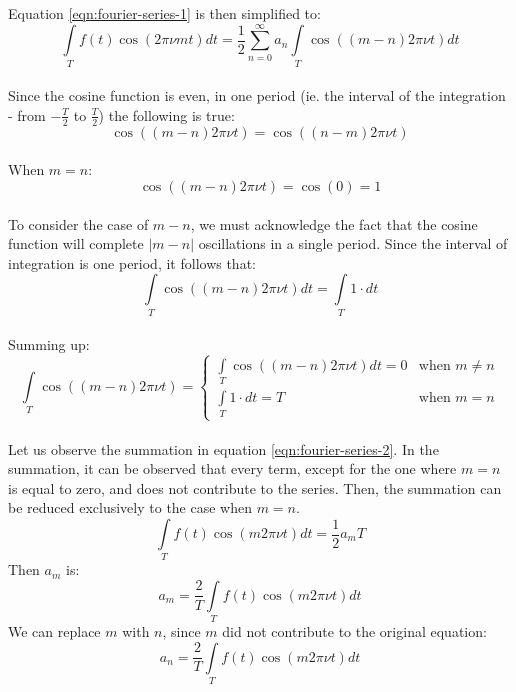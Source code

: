 \documentclass{article}
\begin{document}
Equation \ref{eqn:fourier-series-1} is then simplified to:
\begin{equation}
	\int\limits_{T} f(t) \cos(2 \pi \nu m t) dt = \frac{1}{2} \sum^{\infty}_{n=0} a_n
	\int\limits_{T} \cos( (m - n) 2 \pi \nu t) dt
	\label{eqn:fourier-series-2}
\end{equation}

\paragraph*{}
Since the cosine function is even, in one period (ie. the interval of the
integration - from $-\frac{T}{2}$ to $\frac{T}{2}$) the following is true:
$$\cos( (m - n) 2 \pi \nu t) = \cos( (n - m) 2 \pi \nu t)$$

\paragraph*{}
When $m = n$:
$$\cos( (m - n) 2 \pi \nu t) = \cos(0) = 1$$

\paragraph*{}
To consider the case of $m - n$, we must acknowledge the fact that the cosine
function will complete $\left| m - n \right|$ oscillations in a single period.
Since the interval of integration is one period, it follows that:
$$\int\limits_T \cos( (m - n) 2 \pi \nu t) dt = \int\limits_T 1 \cdot dt$$

\paragraph*{}
Summing up:
\[
	\int\limits_{T} \cos( (m - n) 2 \pi \nu t) = 
	\begin{cases}
		\int\limits_{T} \cos ( (m -n) 2 \pi \nu t) dt = 0 & \text{when } m \neq n \\
		\int\limits_{T} 1 \cdot dt = T & \text{when } m = n
	\end{cases}
\]

\paragraph*{}
Let us observe the summation in equation \ref{eqn:fourier-series-2}. In the
summation, it can be observed that every term, except for the one where $m = n$
is equal to zero, and does not contribute to the series. Then, the summation
can be reduced exclusively to the case when $m=n$.
$$\int\limits_T f(t) \cos(m 2 \pi \nu t) dt = \frac{1}{2} a_m T$$
Then $a_m$ is:
\begin{equation*}
	a_m = \frac{2}{T} \int\limits_T f(t) \cos(m 2 \pi \nu t) dt
\end{equation*}
We can replace $m$ with $n$, since $m$ did not contribute to the original
equation:
\begin{equation}
	a_n = \frac{2}{T} \int\limits_T f(t) \cos(m 2 \pi \nu t) dt
	\label{eqn:fourier-series-amp}
\end{equation}
\end{document}
